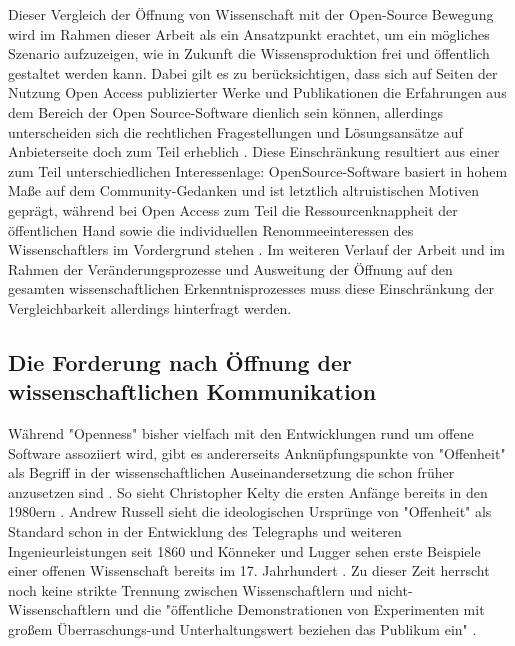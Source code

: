 Dieser Vergleich der Öffnung von Wissenschaft mit der Open-Source Bewegung wird im Rahmen dieser Arbeit als ein Ansatzpunkt erachtet, um ein mögliches Szenario aufzuzeigen, wie in Zukunft die Wissensproduktion frei und öffentlich gestaltet werden kann. Dabei gilt es zu berücksichtigen, dass sich auf Seiten der Nutzung Open Access publizierter Werke und Publikationen die Erfahrungen aus dem Bereich der Open Source-Software dienlich sein können, allerdings unterscheiden sich die rechtlichen Fragestellungen und Lösungsansätze auf Anbieterseite doch zum Teil erheblich \cite{dorschel_2006_open}. Diese Einschränkung resultiert aus einer zum Teil unterschiedlichen Interessenlage: OpenSource-Software basiert in hohem Maße auf dem Community-Gedanken und ist letztlich altruistischen Motiven geprägt, während bei Open Access zum Teil die Ressourcenknappheit der öffentlichen Hand sowie die individuellen Renommeeinteressen des Wissenschaftlers im Vordergrund stehen \cite{dorschel_2006_open}. Im weiteren Verlauf der Arbeit und im Rahmen der Veränderungsprozesse und Ausweitung der Öffnung auf den gesamten wissenschaftlichen Erkenntnisprozesses muss diese Einschränkung der Vergleichbarkeit allerdings hinterfragt werden.

\subsection{Die Forderung nach Öffnung der wissenschaftlichen Kommunikation}

Während "Openness" bisher vielfach mit den Entwicklungen rund um offene Software assoziiert wird, gibt es andererseits Anknüpfungspunkte von "Offenheit" als Begriff in der wissenschaftlichen Auseinandersetzung die schon früher anzusetzen sind \cite{Tkacz_2014}. So sieht Christopher Kel­ty die ersten Anfänge bereits in den 1980ern \cite{kelty_2008_two_bits}. Andrew Russell sieht die ideologischen Ursprünge von "Offenheit" als Standard schon in der Entwicklung des Telegraphs und weiteren Ingenieurleistungen seit 1860 \cite{Russell_2014} und Könneker und Lugger sehen erste Beispiele einer offenen Wissenschaft bereits im 17. Jahrhundert \cite{Konneker_2013}. Zu dieser Zeit herrscht noch keine strikte Trennung zwischen Wissenschaftlern und nicht-Wissenschaftlern und die "öffentliche Demonstrationen von Experimenten mit großem Überraschungs-und Unterhaltungswert beziehen das Publikum ein" \cite{weingart_2005_wissenschaft}.

